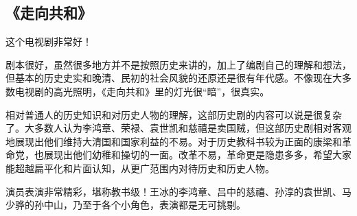 \subsection{《走向共和》}
这个电视剧非常好！

剧本很好，虽然很多地方并不是按照历史来讲的，加上了编剧自己的理解和想法，但基本的历史史实和晚清、民初的社会风貌的还原还是很有年代感。不像现在大多数电视剧的高光照明，《走向共和》里的灯光很“暗”，很真实。

相对普通人的历史知识和对历史人物的理解，这部历史剧的内容可以说是很复杂了。大多数人认为李鸿章、荣禄、袁世凯和慈禧是卖国贼，但这部历史剧相对客观地展现出他们维持大清国和国家利益的不易。对于历史教科书较为正面的康梁和革命党，也展现出他们幼稚和操切的一面。改革不易，革命更是隐患多多，希望大家能超越扁平化和片面认知，从更广范围内对待历史和历史人物。

演员表演非常精彩，堪称教书级！王冰的李鸿章、吕中的慈禧、孙淳的袁世凯、马少骅的孙中山，乃至于各个小角色，表演都是无可挑剔。
